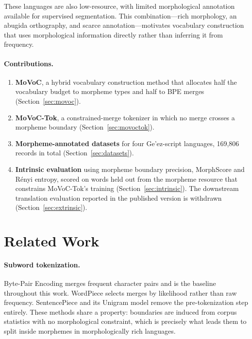 \documentclass[11pt]{article}
\begin{document}
These languages are also low-resource, with limited morphological annotation
available for supervised segmentation. This combination---rich morphology,
an abugida orthography, and scarce annotation---motivates vocabulary
construction that uses morphological information directly rather than inferring
it from frequency.

\paragraph{Contributions.}
\begin{enumerate}
  \item \textbf{MoVoC}, a hybrid vocabulary construction method that allocates
        half the vocabulary budget to morpheme types and half to BPE merges
        (Section~\ref{sec:movoc}).
  \item \textbf{MoVoC-Tok}, a constrained-merge tokenizer in which no merge
        crosses a morpheme boundary (Section~\ref{sec:movoctok}).
  \item \textbf{Morpheme-annotated datasets} for four Ge'ez-script languages,
        169,806 records in total (Section~\ref{sec:datasets}).
  \item \textbf{Intrinsic evaluation} using morpheme boundary precision,
        MorphScore and R\'enyi entropy, scored on words held out from the
        morpheme resource that constrains MoVoC-Tok's training
        (Section~\ref{sec:intrinsic}). The downstream translation evaluation
        reported in the published version is withdrawn
        (Section~\ref{sec:extrinsic}).
\end{enumerate}

\section{Related Work}
\label{sec:related}

\paragraph{Subword tokenization.}
Byte-Pair Encoding \citep{sennrich2016bpe} merges frequent character pairs and
is the baseline throughout this work. WordPiece \citep{schuster2012wordpiece}
selects merges by likelihood rather than raw frequency. SentencePiece and its
Unigram model \citep{kudo2018sentencepiece} remove the pre-tokenization step
entirely. These methods share a property: boundaries are induced from corpus
statistics with no morphological constraint, which is precisely what leads them
to split inside morphemes in morphologically rich languages.
\end{document}
